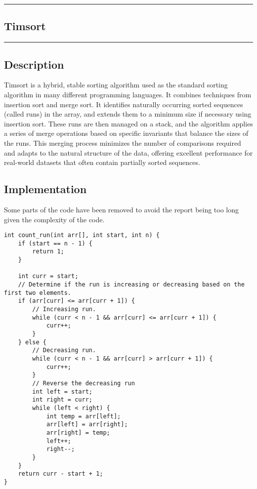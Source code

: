 {\color{gray}\hrule}
\begin{center}
\section{Timsort}
\bigskip
\end{center}
{\color{gray}\hrule}
\begin{multicols}{2}

\subsection{Description}
Timsort is a hybrid, stable sorting algorithm used as the standard sorting algorithm in many different programming languages. It combines techniques from insertion sort and merge sort. It identifies naturally occurring sorted sequences (called runs) in the array, and extends them to a minimum size if necessary using insertion sort.
These runs are then managed on a stack, and the algorithm applies a series of merge operations based on specific invariants that balance the sizes of the runs. This merging process minimizes the number of comparisons required and adapts to the natural structure of the data, offering excellent performance for real-world datasets that often contain partially sorted sequences.

\subsection{Implementation}

Some parts of the code have been removed to avoid the report being too long given the complexity of the code.

\begin{verbatim}
int count_run(int arr[], int start, int n) {
    if (start == n - 1) {
        return 1;
    }

    int curr = start;
    // Determine if the run is increasing or decreasing based on the first two elements.
    if (arr[curr] <= arr[curr + 1]) {
        // Increasing run.
        while (curr < n - 1 && arr[curr] <= arr[curr + 1]) {
            curr++;
        }
    } else {
        // Decreasing run.
        while (curr < n - 1 && arr[curr] > arr[curr + 1]) {
            curr++;
        }
        // Reverse the decreasing run
        int left = start;
        int right = curr;
        while (left < right) {
            int temp = arr[left];
            arr[left] = arr[right];
            arr[right] = temp;
            left++;
            right--;
        }
    }
    return curr - start + 1;
}


\end{verbatim}
\end{multicols}
